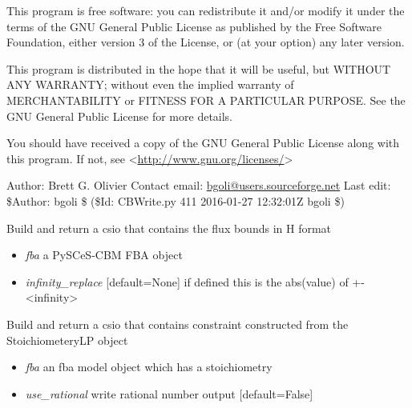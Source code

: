 \documentclass[a4paper,11pt,english]{sphinxmanual}
\begin{document}
This program is free software: you can redistribute it and/or modify
it under the terms of the GNU General Public License as published by
the Free Software Foundation, either version 3 of the License, or
(at your option) any later version.

This program is distributed in the hope that it will be useful,
but WITHOUT ANY WARRANTY; without even the implied warranty of
MERCHANTABILITY or FITNESS FOR A PARTICULAR PURPOSE.  See the
GNU General Public License for more details.

You should have received a copy of the GNU General Public License
along with this program.  If not, see \textless{}\href{http://www.gnu.org/licenses/}{http://www.gnu.org/licenses/}\textgreater{}

Author: Brett G. Olivier
Contact email: \href{mailto:bgoli@users.sourceforge.net}{bgoli@users.sourceforge.net}
Last edit: \$Author: bgoli \$ (\$Id: CBWrite.py 411 2016-01-27 12:32:01Z bgoli \$)

\begin{fulllineitems}
\label{modules_doc:cbmpy.CBWrite.BuildHformatFluxBounds}
Build and return a csio that contains the flux bounds in H format
\begin{itemize}
\item {} 
\emph{fba} a PySCeS-CBM FBA object

\item {} 
\emph{infinity\_replace} {[}default=None{]} if defined this is the abs(value) of +-\textless{}infinity\textgreater{}

\end{itemize}

\end{fulllineitems}


\begin{fulllineitems}
\label{modules_doc:cbmpy.CBWrite.BuildLPConstraints}
Build and return a csio that contains constraint constructed from
the StoichiometeryLP object
\begin{itemize}
\item {} 
\emph{fba} an fba model object which has a stoichiometry

\item {} 
\emph{use\_rational} write rational number output {[}default=False{]}

\end{itemize}

\end{fulllineitems}
\end{document}
